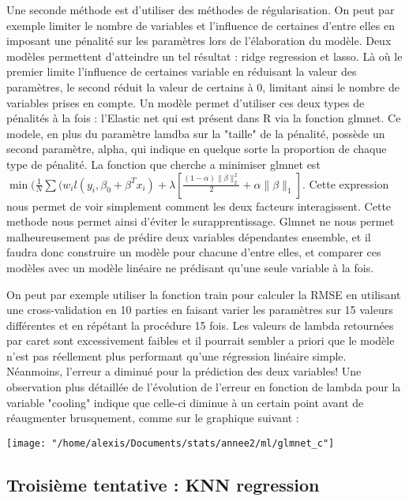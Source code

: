 \documentclass[11pt,a4paper]{article}
\begin{document}
Une seconde méthode est d'utiliser des méthodes de régularisation. On peut par exemple limiter le nombre de variables et l'influence de certaines d'entre elles en imposant une pénalité sur les paramètres lors de l'élaboration du modèle. Deux modèles permettent d'atteindre un tel résultat : ridge regression et lasso. Là où le premier limite l'influence de certaines variable en réduisant la valeur des paramètres, le second réduit la valeur de certains à 0, limitant ainsi le nombre de variables prises en compte. Un modèle permet d'utiliser ces deux types de pénalités à la fois : l'Elastic net qui est présent dans R via la fonction glmnet. Ce modele, en plus du paramètre lamdba sur la "taille" de la pénalité, possède un second paramètre, alpha, qui indique en quelque sorte la proportion de chaque type de pénalité. La fonction que cherche a minimiser glmnet est $\min(\frac{1}{N}\sum(w_i l(y_i,\beta_0+\beta^{T}x_i)+\lambda[\frac{(1-\alpha)\|\beta\|_2^2 }{2}+ \alpha\|\beta\|_1]$. Cette expression nous permet de voir simplement comment les deux facteurs interagissent. Cette methode nous permet ainsi d'éviter le surapprentissage. Glmnet ne nous permet malheureusement pas de prédire deux variables dépendantes ensemble, et il faudra donc construire un modèle pour chacune d'entre elles, et comparer ces modèles avec un modèle linéaire ne prédisant qu'une seule variable à la fois.

On peut par exemple utiliser la fonction train pour calculer la RMSE en utilisant une cross-validation en 10 parties en faisant varier les paramètres sur 15 valeurs différentes et en répétant la procédure 15 fois. Les valeurs de lambda retournées par caret sont excessivement faibles et il pourrait sembler a priori que le modèle n'est pas réellement plus performant qu'une régression linéaire simple. Néanmoins, l'erreur a diminué pour la prédiction des deux variables! Une observation plus détaillée de l'évolution de l'erreur en fonction de lambda pour la variable "cooling" indique que celle-ci diminue à un certain point avant de réaugmenter brusquement, comme sur le graphique suivant :

\begin{center}
\texttt{[image: "/home/alexis/Documents/stats/annee2/ml/glmnet\_c"]}
\end{center}

\subsection{Troisième tentative : KNN regression}
\end{document}
